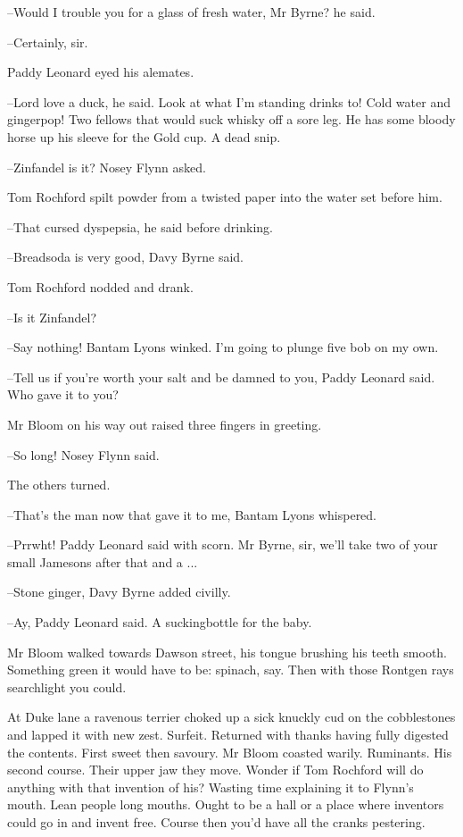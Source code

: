 --Would I trouble you for a glass of fresh water,
Mr Byrne?
he said.

--Certainly,
sir.

Paddy Leonard eyed his alemates.

--Lord love a duck,
he said.
Look at what I'm standing drinks to!
Cold
water and gingerpop!
Two fellows that would suck whisky off a sore leg.
He has some bloody horse up his sleeve for the Gold cup.
A dead snip.

--Zinfandel is it?
Nosey Flynn asked.

Tom Rochford spilt powder from a twisted paper into the water set before
him.

--That cursed dyspepsia,
he said before drinking.

--Breadsoda is very good,
Davy Byrne said.

Tom Rochford nodded and drank.

--Is it Zinfandel?

--Say nothing!
Bantam Lyons winked.
I'm going to plunge five bob on my
own.

--Tell us if you're worth your salt and be damned to you,
Paddy Leonard
said.
Who gave it to you?

Mr Bloom on his way out raised three fingers in greeting.

--So long!
Nosey Flynn said.

The others turned.

--That's the man now that gave it to me,
Bantam Lyons whispered.

--Prrwht!
Paddy Leonard said with scorn.
Mr Byrne,
sir,
we'll take two of
your small Jamesons after that and a ...

--Stone ginger,
Davy Byrne added civilly.

--Ay,
Paddy Leonard said.
A suckingbottle for the baby.

Mr Bloom walked towards Dawson street,
his tongue brushing his teeth
smooth.
Something green it would have to be:
spinach,
say.
Then with
those Rontgen rays searchlight you could.

At Duke lane a ravenous terrier choked up a sick knuckly cud on the
cobblestones and lapped it with new zest.
Surfeit.
Returned with thanks
having fully digested the contents.
First sweet then savoury.
Mr Bloom
coasted warily.
Ruminants.
His second course.
Their upper jaw they move.
Wonder if Tom Rochford will do anything with that invention of his?
Wasting time explaining it to Flynn's mouth.
Lean people long mouths.
Ought to be a hall or a place where inventors could go in and invent
free.
Course then you'd have all the cranks pestering.

